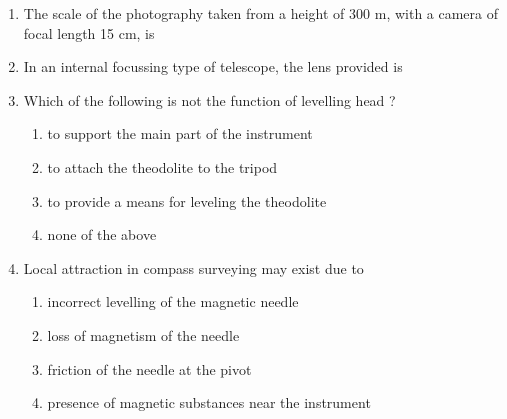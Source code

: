 \documentclass[11pt,a4paper]{article}
\begin{document}
\begin{enumerate}
{}
\\
\item{The scale of the photography taken from a height of 300 m, with a camera of focal length 15 cm, is}
\\
\item{In an internal focussing type of telescope, the lens provided is}
\\
\item{Which of the following is not the function of levelling head ?}
\begin{enumerate}[label=\Alph*.]
\item{to support the main part of the instrument}
\item{to attach the theodolite to the tripod}
\item{to provide a means for leveling the theodolite}
\item{none of the above}
\end{enumerate}
\item{Local attraction in compass surveying may exist due to}
\begin{enumerate}[label=\Alph*.]
\item{incorrect levelling of the magnetic needle}
\item{loss of magnetism of the needle}
\item{friction of the needle at the pivot}
\item{presence of magnetic substances near the instrument}

\end{enumerate}
\end{enumerate}
\end{document}
